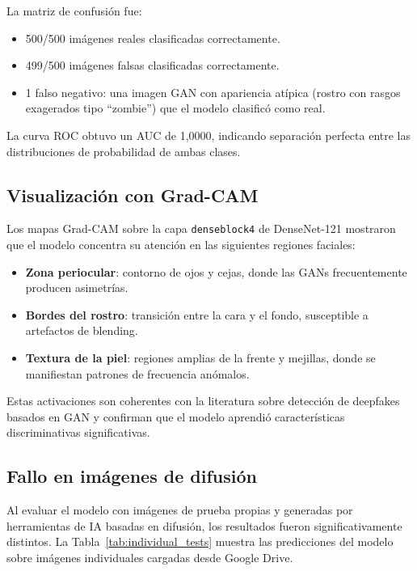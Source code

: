 \documentclass[pdflatex,sn-mathphys-num]{sn-jnl}
\begin{document}
La matriz de confusión fue:
\begin{itemize}
    \item 500/500 imágenes reales clasificadas correctamente.
    \item 499/500 imágenes falsas clasificadas correctamente.
    \item 1 falso negativo: una imagen GAN con apariencia atípica (rostro con rasgos exagerados tipo ``zombie'') que el modelo clasificó como real.
\end{itemize}

La curva ROC obtuvo un AUC de 1,0000, indicando separación perfecta entre las distribuciones de probabilidad de ambas clases.

\subsection{Visualización con Grad-CAM}\label{subsec:gradcam}

Los mapas Grad-CAM sobre la capa \texttt{denseblock4} de DenseNet-121 mostraron que el modelo concentra su atención en las siguientes regiones faciales:
\begin{itemize}
    \item \textbf{Zona periocular}: contorno de ojos y cejas, donde las GANs frecuentemente producen asimetrías.
    \item \textbf{Bordes del rostro}: transición entre la cara y el fondo, susceptible a artefactos de blending.
    \item \textbf{Textura de la piel}: regiones amplias de la frente y mejillas, donde se manifiestan patrones de frecuencia anómalos.
\end{itemize}

Estas activaciones son coherentes con la literatura sobre detección de deepfakes basados en GAN y confirman que el modelo aprendió características discriminativas significativas.

\subsection{Fallo en imágenes de difusión}\label{subsec:diffusion_failure}

Al evaluar el modelo con imágenes de prueba propias y generadas por herramientas de IA basadas en difusión, los resultados fueron significativamente distintos. La Tabla~\ref{tab:individual_tests} muestra las predicciones del modelo sobre imágenes individuales cargadas desde Google Drive.
\end{document}
